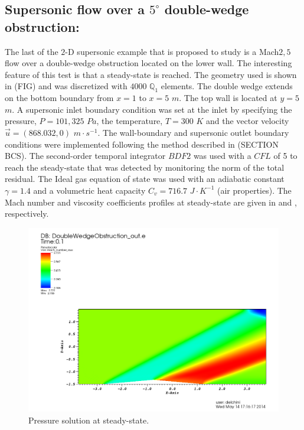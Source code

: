 \subsection{Supersonic flow over a $5^\circ$ double-wedge obstruction:} \label{sec:double_wedge}
The last of the $2$-D supersonic example that is proposed to study is a Mach$2,5$ flow over a double-wedge obstruction located on the lower wall. The interesting feature of this test is that a steady-state is reached. The geometry used is shown in (FIG) and was discretized with $4000$ $\mathbb Q_1$ elements. The double wedge extends on the bottom boundary from $x=1$ to $x=5$  $m$. The top wall is located at $y=5$ $m$. A supersonic inlet boundary condition was set at the inlet by specifying the pressure, $P=101,325$ $Pa$, the temperature, $T=300$ $K$ and the vector velocity $\vec{u} = (868.032, 0)$ $m \cdot s^{-1}$. The wall-boundary and supersonic outlet boundary conditions were implemented following the method described in (SECTION BCS). The second-order temporal integrator $BDF2$ was used with a $CFL$ of 5 to reach the steady-state that was detected by monitoring the norm of the total residual. The Ideal gas equation of state was used with an adiabatic constant $\gamma = 1.4$ and a volumetric heat capacity $C_v = 716.7$ $J \cdot K^{-1}$ (air properties). The Mach number and viscosity coefficients profiles at steady-state are given in  and , respectively. 
        \begin{figure}[H]%
                \centering
                \includegraphics[scale=.50]{figures/DWOMachNumberStt.png}
                \caption{Pressure solution at steady-state.}
                \label{fig:2d_dbwd_stt}
        \end{figure}%
